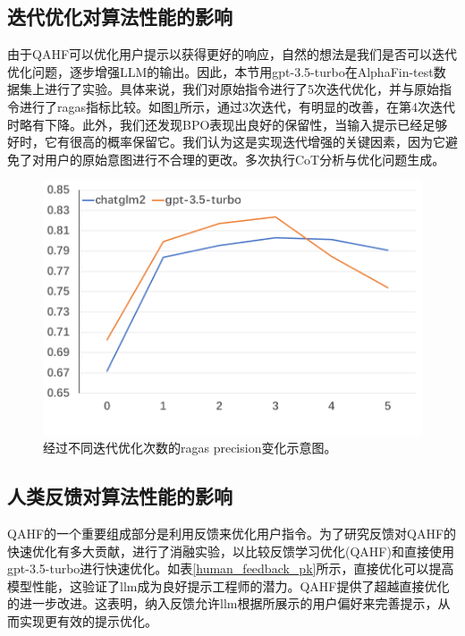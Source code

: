 \subsection{迭代优化对算法性能的影响}

由于QAHF可以优化用户提示以获得更好的响应，自然的想法是我们是否可以迭代优化问题，逐步增强LLM的输出。因此，本节用gpt-3.5-turbo在AlphaFin-test数据集上进行了实验。具体来说，我们对原始指令进行了5次迭代优化，并与原始指令进行了ragas指标比较。如图\ref{multi_iter_optimize_ragas_exp}所示，通过3次迭代，有明显的改善，在第4次迭代时略有下降。此外，我们还发现BPO表现出良好的保留性，当输入提示已经足够好时，它有很高的概率保留它。我们认为这是实现迭代增强的关键因素，因为它避免了对用户的原始意图进行不合理的更改。多次执行CoT分析与优化问题生成。

\begin{figure}[htbp]
	\centering
	\includegraphics[scale=0.45]{Fig/multi_iter_optimize_ragas_exp.png}
	\caption{\label{multi_iter_optimize_ragas_exp}经过不同迭代优化次数的ragas precision变化示意图。}
\end{figure}

\subsection{人类反馈对算法性能的影响}

QAHF的一个重要组成部分是利用反馈来优化用户指令。为了研究反馈对QAHF的快速优化有多大贡献，进行了消融实验，以比较反馈学习优化(QAHF)和直接使用gpt-3.5-turbo进行快速优化。如表\ref{human_feedback_pk}所示，直接优化可以提高模型性能，这验证了llm成为良好提示工程师的潜力。QAHF提供了超越直接优化的进一步改进。这表明，纳入反馈允许llm根据所展示的用户偏好来完善提示，从而实现更有效的提示优化。

